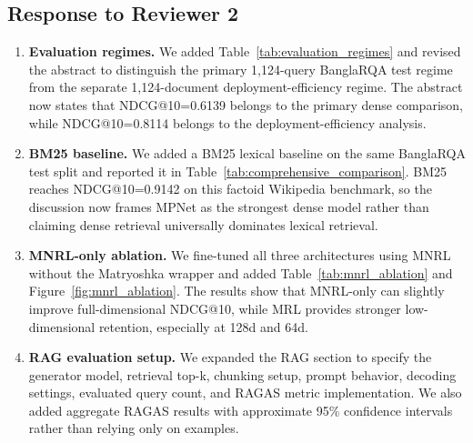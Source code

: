 \documentclass[manuscript,screen,review]{acmart}
\begin{document}
\subsection*{Response to Reviewer 2}
\begin{enumerate}
    \item \textbf{Evaluation regimes.} We added Table~\ref{tab:evaluation_regimes} and revised the abstract to distinguish the primary 1,124-query BanglaRQA test regime from the separate 1,124-document deployment-efficiency regime. The abstract now states that NDCG@10=0.6139 belongs to the primary dense comparison, while NDCG@10=0.8114 belongs to the deployment-efficiency analysis.
    \item \textbf{BM25 baseline.} We added a BM25 lexical baseline on the same BanglaRQA test split and reported it in Table~\ref{tab:comprehensive_comparison}. BM25 reaches NDCG@10=0.9142 on this factoid Wikipedia benchmark, so the discussion now frames MPNet as the strongest dense model rather than claiming dense retrieval universally dominates lexical retrieval.
    \item \textbf{MNRL-only ablation.} We fine-tuned all three architectures using MNRL without the Matryoshka wrapper and added Table~\ref{tab:mnrl_ablation} and Figure~\ref{fig:mnrl_ablation}. The results show that MNRL-only can slightly improve full-dimensional NDCG@10, while MRL provides stronger low-dimensional retention, especially at 128d and 64d.
    \item \textbf{RAG evaluation setup.} We expanded the RAG section to specify the generator model, retrieval top-k, chunking setup, prompt behavior, decoding settings, evaluated query count, and RAGAS metric implementation. We also added aggregate RAGAS results with approximate 95\% confidence intervals rather than relying only on examples.
\end{enumerate}
\end{document}
